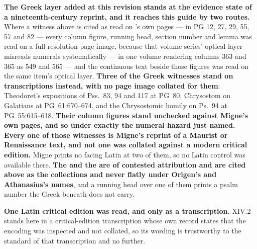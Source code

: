 \textbf{The Greek layer added at this revision stands at the evidence state of
a nineteenth-century reprint, and it reaches this guide by two routes.} Where a
witness above is cited as read on 's own pages --- in
PG 12, 27, 29, 55, 57 and 82 --- every column figure, running head, section
number and lemma was read on a full-resolution page image, because that volume
series' optical layer misreads numerals systematically --- in one volume
rendering columns 363 and 365 as 549 and 565 --- and the continuous text beside
those figures was read on the same item's optical layer. \textbf{Three of the
Greek witnesses stand on transcriptions instead, with no  page image collated for them}: Theodoret's expositions of Pss.~83, 94
and 117 at PG~80, Chrysostom on Galatians at PG~61:670--674, and the
Chrysostomic homily on Ps.~94 at PG~55:615--618. \textbf{Their column figures
stand unchecked against Migne's own pages, and so under exactly the numeral
hazard just named.}
\textbf{Every one of those witnesses is Migne's reprint of a Maurist or
Renaissance text, and not one was collated against a modern critical edition.}
Migne prints no facing Latin at two of them, so no Latin control was available
there. \textbf{The  and the  are of contested attribution and are cited above as the collections and
never flatly under Origen's and Athanasius's names}, and a running head over one
of them prints a psalm number the Greek beneath does not carry.

\textbf{One Latin critical edition was read, and only as a transcription.}
 XIV.2 stands here in a critical-edition transcription
whose own record states that the encoding was inspected and not collated, so its
wording is trustworthy to the standard of that transcription and no further.

